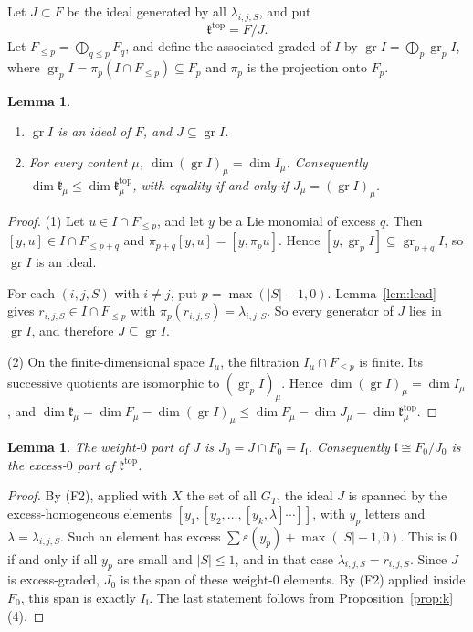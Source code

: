 \documentclass[11pt]{amsart}
\newtheorem{lemma}[theorem]{Lemma}
\theoremstyle{definition}
\theoremstyle{remark}
\newcommand{\lie}{\mathfrak{l}}
\newcommand{\kr}{\mathfrak{k}}
\newcommand{\ktop}{\mathfrak{k}^{\mathrm{top}}}
\begin{document}
Let $J\subset F$ be the ideal generated by all $\lambda_{i,j,S}$, and put
\[
\ktop=F/J.
\]
Let $F_{\le p}=\bigoplus_{q\le p}F_q$, and define the associated graded of $I$ by $\operatorname{gr}I=\bigoplus_p\operatorname{gr}_pI$, where $\operatorname{gr}_pI=\pi_p(I\cap F_{\le p})\subseteq F_p$ and $\pi_p$ is the projection onto $F_p$.

\begin{lemma}\label{lem:grI}
\begin{enumerate}
\item $\operatorname{gr}I$ is an ideal of $F$, and $J\subseteq\operatorname{gr}I$.
\item For every content $\mu$, $\dim(\operatorname{gr}I)_\mu=\dim I_\mu$. Consequently $\dim\kr_\mu\le\dim\ktop_\mu$, with equality if and only if $J_\mu=(\operatorname{gr}I)_\mu$.
\end{enumerate}
\end{lemma}

\begin{proof}
(1) Let $u\in I\cap F_{\le p}$, and let $y$ be a Lie monomial of excess $q$. Then $[y,u]\in I\cap F_{\le p+q}$ and $\pi_{p+q}[y,u]=[y,\pi_pu]$. Hence $[y,\operatorname{gr}_pI]\subseteq\operatorname{gr}_{p+q}I$, so $\operatorname{gr}I$ is an ideal.

For each $(i,j,S)$ with $i\neq j$, put $p=\max(|S|-1,0)$. Lemma~\ref{lem:lead} gives $r_{i,j,S}\in I\cap F_{\le p}$ with $\pi_p(r_{i,j,S})=\lambda_{i,j,S}$. So every generator of $J$ lies in $\operatorname{gr}I$, and therefore $J\subseteq\operatorname{gr}I$.

(2) On the finite-dimensional space $I_\mu$, the filtration $I_\mu\cap F_{\le p}$ is finite. Its successive quotients are isomorphic to $(\operatorname{gr}_pI)_\mu$. Hence $\dim(\operatorname{gr}I)_\mu=\dim I_\mu$, and $\dim\kr_\mu=\dim F_\mu-\dim(\operatorname{gr}I)_\mu\le\dim F_\mu-\dim J_\mu=\dim\ktop_\mu$.
\end{proof}

\begin{lemma}\label{lem:J0}
The weight-$0$ part of $J$ is $J_0=J\cap F_0=I_{\lie}$. Consequently $\lie\cong F_0/J_0$ is the excess-$0$ part of $\ktop$.
\end{lemma}

\begin{proof}
By (F2), applied with $X$ the set of all $G_T$, the ideal $J$ is spanned by the excess-homogeneous elements $[y_1,[y_2,\dots,[y_k,\lambda]\cdots]]$, with $y_p$ letters and $\lambda=\lambda_{i,j,S}$. Such an element has excess $\sum\varepsilon(y_p)+\max(|S|-1,0)$. This is $0$ if and only if all $y_p$ are small and $|S|\le1$, and in that case $\lambda_{i,j,S}=r_{i,j,S}$. Since $J$ is excess-graded, $J_0$ is the span of these weight-$0$ elements. By (F2) applied inside $F_0$, this span is exactly $I_{\lie}$. The last statement follows from Proposition~\ref{prop:k}(4).
\end{proof}
\end{document}
